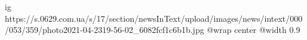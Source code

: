  
 
 
 
 

\ifcmt
  ig https://s.0629.com.ua/s/17/section/newsInText/upload/images/news/intext/000/053/359/photo2021-04-2319-56-02_6082fcf1c6b1b.jpg
  @wrap center
  @width 0.9
\fi
